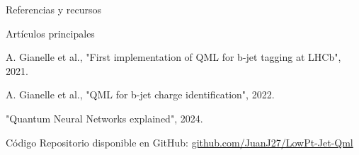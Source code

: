 \documentclass[aspectratio=43]{beamer}
\begin{document}
\begin{frame}{Referencias y recursos}
  \begin{block}{Artículos principales}
    \begin{thebibliography}{3}
        A. Gianelle et al., "First implementation of QML for b-jet tagging at LHCb", 2021.
        \href{https://indico.cern.ch/event/1053287/contributions/4442055/attachments/2332563/3975381/qml@lhcb_zuliani.pdf}{}
      
        A. Gianelle et al., "QML for b-jet charge identification", 2022.
        \href{https://arxiv.org/pdf/2202.13943}{}
      
        "Quantum Neural Networks explained", 2024.
        \href{https://youtu.be/xL383DseSpE}{}
    \end{thebibliography}
  \end{block}
  
  \begin{alertblock}{Código}
    Repositorio disponible en GitHub: \url{github.com/JuanJ27/LowPt-Jet-Qml}
  \end{alertblock}
\end{frame}
\end{document}
